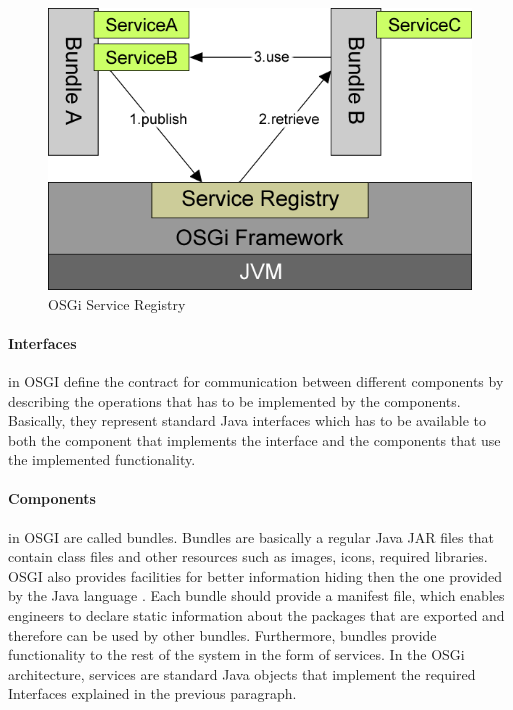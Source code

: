 \begin{figure}[h!]
  \centering
  	\includegraphics[scale=0.6]{plug-in/OSGI.png}
  \caption{OSGi Service Registry \cite{Andre}}
  \label{fig_osgi}
\end{figure}

\paragraph{Interfaces}
 in OSGI define the contract for communication between different components by describing the operations that has to be implemented by the components. Basically, they represent standard Java interfaces which has to be available to both the component that implements the interface and the components that use the implemented functionality.


\paragraph{Components}
  in OSGI are called bundles. Bundles are basically a regular Java JAR files that contain class files and other resources such as images, icons, required libraries. OSGI also provides facilities for better information hiding then the one provided by the Java language \cite{Andre}. Each bundle should provide a manifest file, which enables engineers to declare static information about the packages that are exported and therefore can be used by other bundles. Furthermore, bundles provide functionality to the rest of the system in the form of services. In the OSGi architecture, services are standard Java objects that implement the required  Interfaces explained in the previous paragraph.

